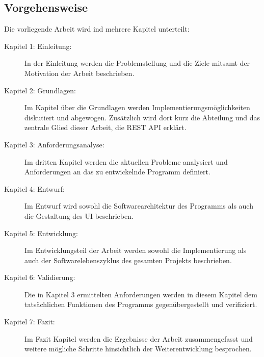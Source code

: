 \subsection{Vorgehensweise}
Die vorliegende Arbeit wird ind mehrere Kapitel unterteilt:

\begin{description}

    \item[Kapitel 1: Einleitung:]
    In der Einleitung werden die Problemstellung und die Ziele mitsamt der Motivation
    der Arbeit beschrieben.
    
    \item[Kapitel 2: Grundlagen:]
    Im Kapitel über die Grundlagen werden Implementierungsmöglichkeiten diskutiert
    und abgewogen. Zusätzlich wird dort kurz die Abteilung und das zentrale Glied
    dieser Arbeit, die \gls{REST} \gls{API} erklärt.

    \item[Kapitel 3: Anforderungsanalyse:]
    Im dritten Kapitel werden die aktuellen Probleme analysiert und Anforderungen an 
    das zu entwickelnde Programm definiert.

    \item[Kapitel 4: Entwurf:]
    Im Entwurf wird sowohl die Softwarearchitektur des Programms als auch die Gestaltung 
    des \gls{UI} beschrieben.
    
    \item[Kapitel 5: Entwicklung:]
    Im Entwicklungsteil der Arbeit werden sowohl die Implementierung als auch 
    der Softwarelebenszyklus des gesamten Projekts beschrieben.

    \item[Kapitel 6: Validierung:]
    Die in Kapitel 3 ermittelten Anforderungen werden in diesem Kapitel dem 
    tatsächlichen Funktionen des Programms gegenübergestellt und verifiziert.

    \item[Kapitel 7: Fazit:]
    Im Fazit Kapitel werden die Ergebnisse der Arbeit zusammengefasst und weitere
    mögliche Schritte hinsichtlich der Weiterentwicklung besprochen.

\end{description}
\newpage



